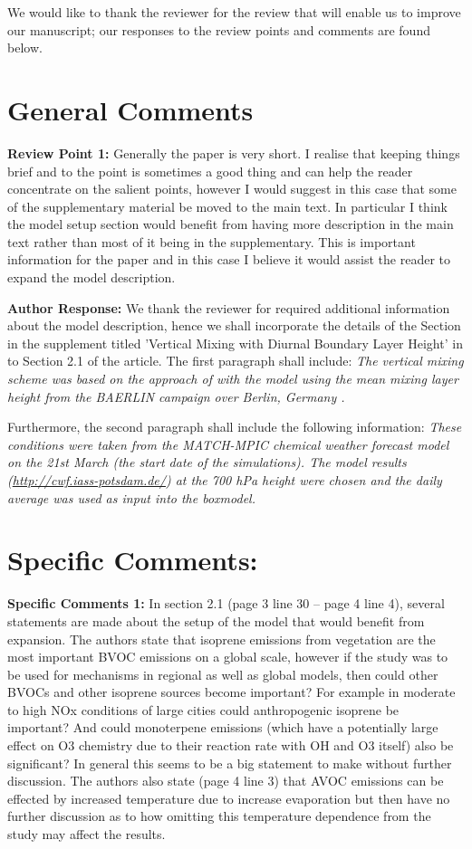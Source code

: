 \documentclass{article}
\begin{document}
We would like to thank the reviewer for the review that will enable us to improve our manuscript; our responses to the review points and comments are found below.

\section*{General Comments}

\textbf{Review Point 1:}  Generally the paper is very short. I realise that keeping things brief and to the point is sometimes a good thing and can help the reader concentrate on the salient points, however I would suggest in this case that some of the supplementary material be moved to the main text. In particular I think the model setup section would benefit from having more description in the main text rather than most of it being in the supplementary. This is important information for the paper and in this case I believe it would assist the reader to expand the model description.

\textbf{Author Response:} We thank the reviewer for required additional information about the model description, hence we shall incorporate the details of the Section in the supplement titled 'Vertical Mixing with Diurnal Boundary Layer Height' in to Section 2.1 of the article.
The first paragraph shall include: \textit{The vertical mixing scheme was based on the approach of \citet{Lourens:2016} with the model using the mean mixing layer height from the BAERLIN campaign over Berlin, Germany \citep{Bonn:2016}.}

Furthermore, the second paragraph shall include the following information:
\textit{These conditions were taken from the MATCH-MPIC chemical weather forecast model on the 21st March (the start date of the simulations). 
The model results (\url{http://cwf.iass-potsdam.de/}) at the 700 hPa height were chosen and the daily average was used as input into the boxmodel.  
}

\section*{Specific Comments:}
\textbf{Specific Comments 1:}  In section 2.1 (page 3 line 30 – page 4 line 4), several statements are made about the setup of the model that would benefit from expansion. The authors state that isoprene emissions from vegetation are the most important BVOC emissions on a global scale, however if the study was to be used for mechanisms in regional as well as global models, then could other BVOCs and other isoprene sources become important? For example in moderate to high NOx conditions of large cities could anthropogenic isoprene be important? And could monoterpene emissions (which have a potentially large effect on O3 chemistry due to their reaction rate with OH and O3 itself) also be significant? In general this seems to be a big statement to make without further discussion. The authors also state (page 4 line 3) that AVOC emissions can be effected by increased temperature due to increase evaporation but then have no further discussion as to how omitting this temperature dependence from the study may affect the results.
\end{document}
